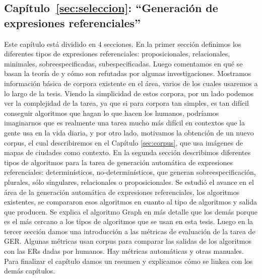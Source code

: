 \subsection{Cap\'itulo~\ref{sec:seleccion}: ``Generaci\'on de expresiones referenciales''} 
Este cap\'itulo est\'a dividido en 4 secciones. En la primer secci\'on definimos los diferentes tipos de expresiones referenciales: proposicionales, relacionales, minimales, sobreespecificadas, subespecificadas. Luego comentamos en qu\'e se basan la teor\'ia de \cite{clark1992arenas,clark96,Clark-Marshall81} y c\'omo son refutadas por algunas investigaciones. Mostramos informaci\'on b\'asica de corpora existente en el \'area, varios de los cuales usaremos a lo largo de la tesis. Viendo la simplicidad de estos corpora, por un lado podemos ver la complejidad de la tarea, ya que si para corpora tan simples, es tan dif\'icil conseguir algoritmos que hagan lo que hacen los humanos, podr\'iamos imaginarnos que es realmente una tarea mucho m\'as dif\'icil en contextos que la gente usa en la vida diaria, y por otro lado, motivamos la obtenci\'on de un nuevo  corpus, el cual describiremos en el Cap\'itulo \ref{sec:corpus}, que usa im\'agenes de mapas de ciudades como contexto. En la segunda secci\'on describimos diferentes tipos de algoritmos para la tarea de generaci\'on autom\'atica de expresiones referenciales: determin\'isticos, no-determin\'isticos, que generan sobreespecificaci\'on, plurales, s\'olo singulares, relacionales o proposicionales. Se estudi\'o el avance en el \'area de la generaci\'on autom\'atica de expresiones referenciales, los algoritmos existentes, se compararon esos algoritmos en cuanto al tipo de algoritmos y salida que producen. Se explica el algoritmo Graph en m\'as detalle que los dem\'as porque es el m\'as cercano a los tipos de algoritmos que se usan en esta tesis. Luego en la tercer secci\'on damos una introducci\'on a las m\'etricas de evaluaci\'on de la tarea de GER. Algunas m\'etricas usan corpus para comparar las salidas de los algoritmos con las ERs dadas por humanos. Hay m\'etricas autom\'aticas y otras manuales. Para finalizar el cap\'itulo damos un resumen y explicamos c\'omo se linkea con los dem\'as cap\'itulos.

